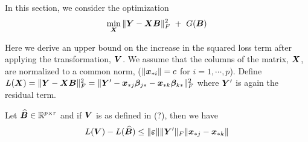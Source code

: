 In this section, we consider the optimization
\begin{equation}\label{eqn:L2}
\min_{\bX} \|\bY - \bX \bB \|_F^2 \ + \ G(\bB)   
\end{equation}

Here we derive an upper bound on the increase in the squared loss term after applying the transformation, $\boldsymbol{V}$. We assume that the columns of the matrix, $\boldsymbol{X}$, are normalized to a common norm, \ie ($\|\boldsymbol{x}_{{\ast} i}\| = c$ for $i = 1,\cdots,p$). Define $L(\boldsymbol{X}) = \|\boldsymbol{Y} - \boldsymbol{X} \boldsymbol{B} \|_F^2 = \|\boldsymbol{Y}' - \boldsymbol{x}_{{\ast} j} \boldsymbol{\beta}_{j {\ast}} - \boldsymbol{x}_{{\ast} k} \boldsymbol{\beta}_{k {\ast}}\|_F^2$ where $\boldsymbol{Y}'$ is again the residual term. 

\begin{lemma}
Let $\widehat{\boldsymbol{B}} \in {\mathbb R}^{p \times r}$ and if $\boldsymbol{V}$ is as defined in (?), then we have 
$$L(\boldsymbol{V}) - L(\widehat{\boldsymbol{B}}) \leq \|\boldsymbol{\varepsilon}\|  \|\boldsymbol{Y}'\|_F \| \boldsymbol{x}_{{\ast} j} - \boldsymbol{x}_{{\ast} k} \|$$
\end{lemma}
